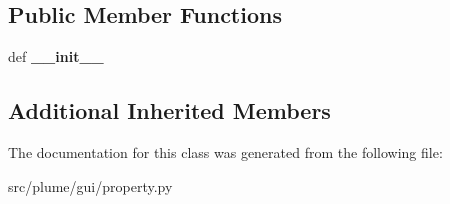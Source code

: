\subsection*{Public Member Functions}
\begin{DoxyCompactItemize}
\item 
def {\bfseries \+\_\+\+\_\+init\+\_\+\+\_\+}\hypertarget{classplume-creator_1_1src_1_1plume_1_1gui_1_1property_1_1_note_property_a14b1be2dd8a78d32305e3bf224dc4ae5}{}\label{classplume-creator_1_1src_1_1plume_1_1gui_1_1property_1_1_note_property_a14b1be2dd8a78d32305e3bf224dc4ae5}

\end{DoxyCompactItemize}
\subsection*{Additional Inherited Members}


The documentation for this class was generated from the following file\+:\begin{DoxyCompactItemize}
\item 
src/plume/gui/property.\+py\end{DoxyCompactItemize}
